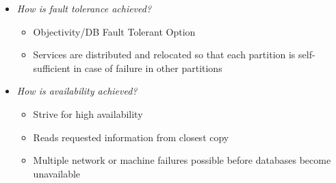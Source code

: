 \begin{itemize}
\item \emph{How is fault tolerance achieved?}
\begin{itemize}
	\item Objectivity/DB Fault Tolerant Option
	\item Services are distributed and relocated so that each partition is self-sufficient in case of failure in other partitions
\end{itemize}

\item \emph{How is availability achieved?}
\begin{itemize}
\item Strive for high availability
\item Reads requested information from closest copy
\item Multiple network or machine failures possible before databases become unavailable
\end{itemize}

\end{itemize}